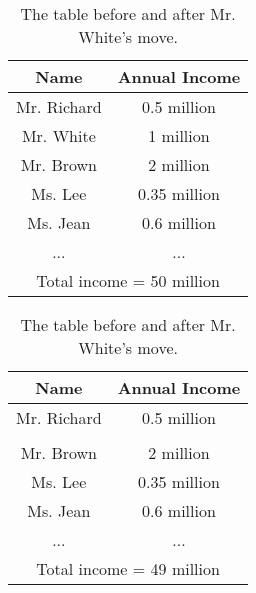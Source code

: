 \documentclass[a4paper, 11pt]{article} %
\begin{document}
\begin{table}
	\begin{tabular}{||c||c||}
		\hline
		Name & Annual Income  \\ [0.5ex]
		\hline\hline
		Mr. Richard & 0.5 million  \\
		\hline
		Mr. White & 1 million \\
		\hline
		Mr. Brown & 2 million \\
		\hline
		Ms. Lee & 0.35 million \\
		\hline
		Ms. Jean & 0.6 million \\
		\hline
		... & ...  \\
		\hline
		\multicolumn{2}{||c||}{Total income = 50 million}\\
		\hline
	\end{tabular}
\quad\quad
\begin{tabular}{||c || c||}
	\hline
	Name & Annual Income  \\ [0.5ex]
	\hline\hline
	Mr. Richard & 0.5 million  \\
	\hline
      &  \\
	\hline
	Mr. Brown & 2 million \\
	\hline
	Ms. Lee & 0.35 million \\
	\hline
	Ms. Jean & 0.6 million \\
	\hline
	... & ...  \\
	\hline
	\multicolumn{2}{||c||}{Total income = 49 million}\\
	\hline
\end{tabular}
	\caption{The table before and after Mr. White's move. }
	\label{table:1}
\end{table}
\end{document}
